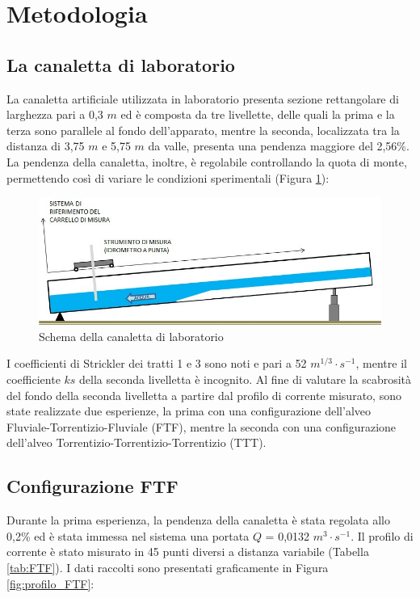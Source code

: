 \documentclass[12pt]{article} %
\begin{document}
\newpage
\section{Metodologia}
\subsection{La canaletta di laboratorio}

\noindent La canaletta artificiale utilizzata in laboratorio presenta sezione rettangolare di larghezza pari a 0,3 $m$ ed è composta da tre livellette, delle quali la prima e la terza sono parallele al fondo dell’apparato, mentre la seconda, localizzata tra la distanza di 3,75 $m$ e 5,75 $m$ da valle, presenta una pendenza maggiore del 2,56\%. \\
La pendenza della canaletta, inoltre, è regolabile controllando la quota di monte, permettendo così di variare le condizioni sperimentali (Figura \ref{fig:canaletta}):

\begin{figure}[H]
    \centering
    \includegraphics[scale=0.6]{Canaletta.jpg}
    \caption{Schema della canaletta di laboratorio}
    \label{fig:canaletta}
\end{figure}

\noindent I coefficienti di Strickler dei tratti 1 e 3 sono noti e pari a 52 $m^{1/3}\cdot s^{-1}$, mentre il coefficiente $ks$ della seconda livelletta è incognito. Al fine di valutare la scabrosità del fondo della seconda livelletta a partire dal profilo di corrente misurato, sono state realizzate due esperienze, la prima con una configurazione dell’alveo Fluviale-Torrentizio-Fluviale (FTF), mentre la seconda con una configurazione dell'alveo Torrentizio-Torrentizio-Torrentizio (TTT).

\subsection{Configurazione FTF}

\noindent Durante la prima esperienza, la pendenza della canaletta è stata regolata allo 0,2\% ed è stata immessa nel sistema una portata $Q$ = 0,0132 $m^3\cdot s^{-1}$. Il profilo di corrente è stato misurato in 45 punti diversi a distanza variabile (Tabella \ref{tab:FTF}). I dati raccolti sono presentati graficamente in Figura \ref{fig:profilo_FTF}:
\end{document}
